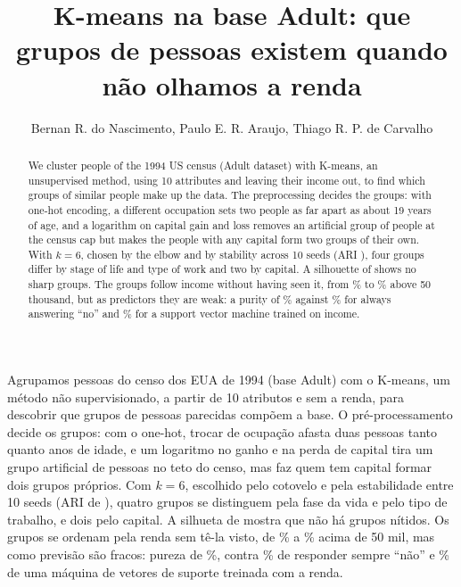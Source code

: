 \documentclass[12pt]{article}
\title{K-means na base Adult: que grupos de pessoas existem quando não olhamos a renda}
\author{Bernan R. do Nascimento\inst{1}, Paulo E. R. Araujo\inst{1}, Thiago R. P. de Carvalho\inst{1}}
\begin{document}
\maketitle

\begin{abstract}
  We cluster \clLinhasEn{} people of the 1994 US census (Adult dataset) with K-means, an unsupervised
  method, using 10 attributes and leaving their income out, to find which groups of similar people make
  up the data. The preprocessing decides the groups: with one-hot encoding, a different occupation sets two
  people as far apart as about 19 years of age, and a logarithm on capital gain and loss removes an
  artificial group of \clTeto{} people at the census cap but makes the people with any capital form two
  groups of their own. With $k = 6$, chosen by the elbow and by stability across 10 seeds (ARI
  \clAriSeisEn), four groups differ by stage of life and type of work and two by capital. A silhouette of
  \clSilSeisEn{} shows no sharp groups. The groups follow income without having seen it, from \clPosUmEn\%
  to \clPosSeisEn\% above 50 thousand, but as predictors they are weak: a purity of \clPurezaEn\% against
  \clChuteEn\% for always answering ``no'' and \clSvmAccEn\% for a support vector machine trained on income.
\end{abstract}

\begin{resumo}
  Agrupamos \clLinhas{} pessoas do censo dos EUA de 1994 (base Adult) com o K-means, um método não
  supervisionado, a partir de 10 atributos e sem a renda, para descobrir que grupos de pessoas parecidas
  compõem a base. O pré-processamento decide os grupos: com o one-hot, trocar de ocupação afasta duas
  pessoas tanto quanto \clTrocaAnos{} anos de idade, e um logaritmo no ganho e na perda de capital tira um
  grupo artificial de \clTeto{} pessoas no teto do censo, mas faz quem tem capital formar dois grupos
  próprios. Com $k = 6$, escolhido pelo cotovelo e pela estabilidade entre 10 seeds (ARI de \clAriSeis),
  quatro grupos se distinguem pela fase da vida e pelo tipo de trabalho, e dois pelo capital. A silhueta de
  \clSilSeis{} mostra que não há grupos nítidos. Os grupos se ordenam pela renda sem tê-la visto, de
  \clPosUm\% a \clPosSeis\% acima de 50 mil, mas como previsão são fracos: pureza de \clPureza\%, contra
  \clChute\% de responder sempre ``não'' e \clSvmAcc\% de uma máquina de vetores de suporte treinada com a
  renda.
\end{resumo}











\end{document}
